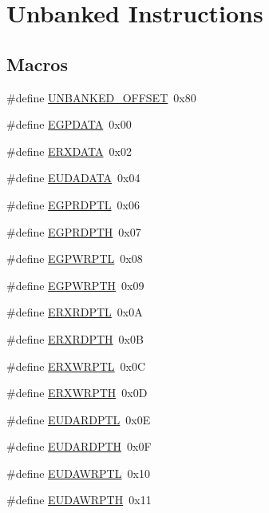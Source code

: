 \hypertarget{group___b_a_n_k___u_n}{}\section{Unbanked Instructions}
\label{group___b_a_n_k___u_n}
\subsection*{Macros}
\begin{DoxyCompactItemize}
\item 
\#define \mbox{\hyperlink{group___b_a_n_k___u_n_ga1bb57742c49c9baeab79d2fdacd942ce}{U\+N\+B\+A\+N\+K\+E\+D\+\_\+\+O\+F\+F\+S\+ET}}~0x80
\item 
\#define \mbox{\hyperlink{group___b_a_n_k___u_n_gaebc9eb7f0ff315389dd12d432687bc19}{E\+G\+P\+D\+A\+TA}}~0x00
\item 
\#define \mbox{\hyperlink{group___b_a_n_k___u_n_ga8c5417139f09a6c6e76b6f36d7b215ce}{E\+R\+X\+D\+A\+TA}}~0x02
\item 
\#define \mbox{\hyperlink{group___b_a_n_k___u_n_ga53f36c25d1efcb777c5e33d984721955}{E\+U\+D\+A\+D\+A\+TA}}~0x04
\item 
\#define \mbox{\hyperlink{group___b_a_n_k___u_n_ga06f3e79e9e86fde4dd7793cc864c1d66}{E\+G\+P\+R\+D\+P\+TL}}~0x06
\item 
\#define \mbox{\hyperlink{group___b_a_n_k___u_n_gab8aec06db17276a345f947275bd7fe68}{E\+G\+P\+R\+D\+P\+TH}}~0x07
\item 
\#define \mbox{\hyperlink{group___b_a_n_k___u_n_ga66d2859746d6c90f180f2c1266c9ffec}{E\+G\+P\+W\+R\+P\+TL}}~0x08
\item 
\#define \mbox{\hyperlink{group___b_a_n_k___u_n_ga4d30fe6f7033235fd0afbbb198fb3620}{E\+G\+P\+W\+R\+P\+TH}}~0x09
\item 
\#define \mbox{\hyperlink{group___b_a_n_k___u_n_ga0e4345b59cc531bd8daee2cd8c8e906b}{E\+R\+X\+R\+D\+P\+TL}}~0x0A
\item 
\#define \mbox{\hyperlink{group___b_a_n_k___u_n_ga1668b845f0bc37dbb515c2358357a690}{E\+R\+X\+R\+D\+P\+TH}}~0x0B
\item 
\#define \mbox{\hyperlink{group___b_a_n_k___u_n_ga7d78e648da085c6fdf006d75b3c99a7a}{E\+R\+X\+W\+R\+P\+TL}}~0x0C
\item 
\#define \mbox{\hyperlink{group___b_a_n_k___u_n_ga9c9ff6952a5cb0c0b420bc6a405d726c}{E\+R\+X\+W\+R\+P\+TH}}~0x0D
\item 
\#define \mbox{\hyperlink{group___b_a_n_k___u_n_ga06b17c501cd537fb4a777bc34817662a}{E\+U\+D\+A\+R\+D\+P\+TL}}~0x0E
\item 
\#define \mbox{\hyperlink{group___b_a_n_k___u_n_gaf26365195bc63edeec44a77dff6a8bcb}{E\+U\+D\+A\+R\+D\+P\+TH}}~0x0F
\item 
\#define \mbox{\hyperlink{group___b_a_n_k___u_n_gacf2456afd24006abb6177987c7d25a45}{E\+U\+D\+A\+W\+R\+P\+TL}}~0x10
\item 
\#define \mbox{\hyperlink{group___b_a_n_k___u_n_ga3b68835e3131fd70a530d2dc785e85fd}{E\+U\+D\+A\+W\+R\+P\+TH}}~0x11
\end{DoxyCompactItemize}


